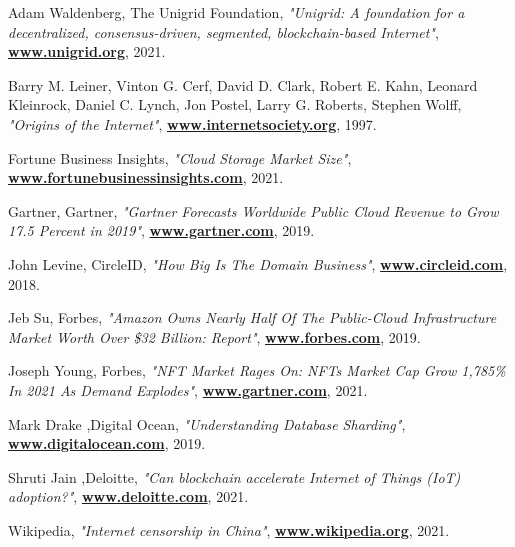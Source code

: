 \documentclass[a4paper,oneside]{article}
\let\oldhref\href
\renewcommand{\href}[2]{\oldhref{#1}{\bfseries#2}}
\begin{document}
\newpage
\begin{thebibliography}{999}
    Adam Waldenberg, The Unigrid Foundation,
    \emph{"Unigrid: A foundation for a decentralized, consensus-driven, segmented, blockchain-based Internet"},
    \href{https://www.unigrid.org/about}{www.unigrid.org},
    2021.

    Barry M. Leiner, Vinton G. Cerf, David D. Clark, Robert E. Kahn, Leonard Kleinrock, Daniel C. Lynch, Jon Postel, Larry G. Roberts, Stephen Wolff,
    \emph{"Origins of the Internet"},
    \href{https://www.internetsociety.org/internet/history-internet/brief-history-internet}{www.internetsociety.org},
    1997.

    Fortune Business Insights,
    \emph{"Cloud Storage Market Size"},
    \href{https://www.fortunebusinessinsights.com/cloud-storage-market-102773}{www.fortunebusinessinsights.com},
    2021.

    Gartner, Gartner,
    \emph{"Gartner Forecasts Worldwide Public Cloud Revenue to Grow 17.5 Percent in 2019"},
    \href{https://www.gartner.com/en/newsroom/press-releases/2019-04-02-gartner-forecasts-worldwide-public-cloud-revenue-to-g}{www.gartner.com},
    2019.

    John Levine, CircleID,
    \emph{"How Big Is The Domain Business"},
    \href{https://www.circleid.com/posts/20180813_how_big_is_the_domain_business/}{www.circleid.com},
    2018.

    Jeb Su, Forbes,
    \emph{"Amazon Owns Nearly Half Of The Public-Cloud Infrastructure Market Worth Over \$32 Billion: Report"},
    \href{https://www.forbes.com/sites/jeanbaptiste/2019/08/02/amazon-owns-nearly-half-of-the-public-cloud-infrastructure-market-worth-over-32-billion-report/ }{www.forbes.com},
    2019.

    Joseph Young, Forbes,
    \emph{"NFT Market Rages On: NFTs Market Cap Grow 1,785\% In 2021 As Demand Explodes"},
    \href{https://www.forbes.com/sites/youngjoseph/2021/03/29/nft-market-rages-on-nfts-market-cap-grow-1785-in-2021-as-demand-explodes/
}{www.gartner.com},
    2021.

    Mark Drake ,Digital Ocean,
    \emph{"Understanding Database Sharding"},
    \href{https://www.digitalocean.com/community/tutorials/understanding-database-sharding}{www.digitalocean.com},
    2019.

    Shruti Jain ,Deloitte,
    \emph{"Can blockchain accelerate Internet of Things (IoT) adoption?"},
    \href{https://www2.deloitte.com/ch/en/pages/innovation/articles/blockchain-accelerate-iot-adoption.html}{www.deloitte.com},
    2021.

    Wikipedia,
    \emph{"Internet censorship in China"},
    \href{https://www.wikipedia.org/wiki/Internet_censorship_in_China}{www.wikipedia.org},
    2021.
\end{thebibliography}
\end{document}
